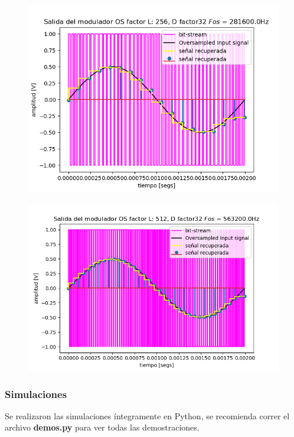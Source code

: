 \begin{figure}[H]
	\centering
	\includegraphics[width=0.7\linewidth]{ImagenesEjercicio2/SenalRecuperada256.png}
	\caption{}
	\label{fig:senalrecuperada256}
\end{figure}
\begin{figure}[H]
	\centering
	\includegraphics[width=0.7\linewidth]{ImagenesEjercicio2/SenalRecuperada512.png}
	\caption{}
	\label{fig:senalrecuperada256}
\end{figure}

\subsubsection{Simulaciones}
Se realizaron las simulaciones íntegramente en Python, se recomienda correr el archivo \textbf{demos.py} para ver todas las demostraciones.

